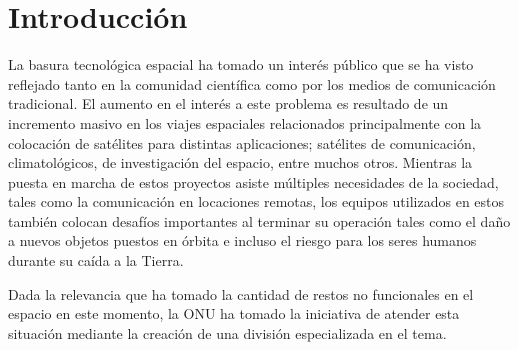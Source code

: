 \section*{Introducción}\label{Sec:Introduction}

La basura tecnológica espacial ha tomado un interés público que se ha visto reflejado tanto en la comunidad científica como por los medios de comunicación tradicional. El aumento en el interés a este problema es resultado de un incremento masivo en los viajes espaciales relacionados principalmente con la colocación de satélites para distintas aplicaciones; satélites de comunicación, climatológicos, de investigación del espacio, entre muchos otros. Mientras la puesta en marcha de estos proyectos asiste múltiples necesidades de la sociedad, tales como la comunicación en locaciones remotas, los equipos utilizados en estos también colocan desafíos importantes al terminar su operación tales como el daño a nuevos objetos puestos en órbita e incluso el riesgo para los seres humanos durante su caída a la Tierra.

Dada la relevancia que ha tomado la cantidad de restos no funcionales en el espacio en este momento, la ONU ha tomado la iniciativa de atender esta situación mediante la creación de una división especializada en el tema.
